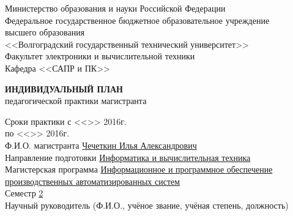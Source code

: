 \documentclass[a4paper, 14pt]{extreport}
\begin{document}
    \onehalfspacing
    \begin{titlepage}
        \begin{center}
            Министерство образования и науки Российской Федерации\\
            Федеральное государственное бюджетное образовательное учреждение\\
            высшего образования\\
            <<Волгоградский государственный технический университет>>\\
            Факультет электроники и вычислительной техники\\
            Кафедра <<САПР и ПК>>
        \end{center}
        \vspace{2cm}
        \begin{center}
            \large \textbf{ИНДИВИДУАЛЬНЫЙ ПЛАН} \\
            педагогической практики магистранта
        \end{center}
        \vspace{2cm}
        Сроки практики с <<\underline{\hspace{3em}}>> \underline{\hspace{9em}} 2016г.\\
        \hspace*{6.35em} по <<\underline{\hspace{3em}}>> \underline{\hspace{9em}} 2016г.\\
        Ф.И.О. магистранта \underline{Чечеткин Илья Александрович\hspace{10.8em}} \\
        Направление подготовки \underline{Информатика и вычислительная техника\hspace{4.5em}} \\
        Магистерская программа \underline{Информационное и программное обеспечение\hspace{2.1em}}\\
        \underline{производственных автоматизированных систем\hspace{12.9em}} \\
        Семестр \underline{\hspace{1cm}2\hspace{1cm}} \\

        \noindent Научный руководитель (Ф.И.О., учёное звание, учёная степень, должность)\\
        \underline{\hspace{\textwidth}}\\
        \underline{\hspace{\textwidth}}\\
        \underline{\hspace{\textwidth}}
    \end{titlepage}
\end{document}
